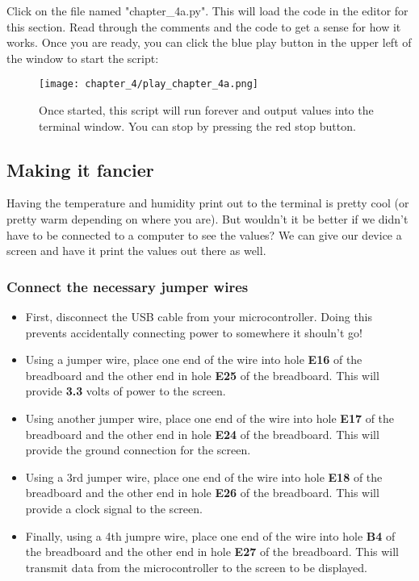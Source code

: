 Click on the file named "chapter\_4a.py". This will load the code in the editor for this section. Read through the comments
and the code to get a sense for how it works. Once you are ready, you can click the blue play button in the upper left of the window to start the script:
\begin{figure}[H]
    \centering
    \texttt{[image: chapter\_4/play\_chapter\_4a.png]}
    \caption{Once started, this script will run forever and output values into the terminal window. You can stop by pressing the red stop button.}
\end{figure}

\subsection{Making it fancier}
Having the temperature and humidity print out to the terminal is pretty cool (or pretty warm depending on where you are).
But wouldn't it be better if we didn't have to be connected to a computer to see the values? We can give our device a screen and have it print the values out there as well.

\subsubsection{Connect the necessary jumper wires}
\begin{itemize}
    \item First, disconnect the USB cable from your microcontroller. Doing this prevents accidentally connecting power to somewhere it shouln't go!
    \item Using a jumper wire, place one end of the wire into hole \textbf{E16} of the breadboard and the other end in
    hole \textbf{E25} of the breadboard. This will provide \textbf{3.3} volts of power to the screen.
    \item Using another jumper wire, place one end of the wire into hole \textbf{E17} of the breadboard and the other end
    in hole \textbf{E24} of the breadboard. This will provide the ground connection for the screen.
    \item Using a 3rd jumper wire, place one end of the wire into hole \textbf{E18} of the breadboard and the other end
    in hole \textbf{E26} of the breadboard. This will provide a clock signal to the screen.
    \item Finally, using a 4th jumpre wire, place one end of the wire into hole \textbf{B4} of the breadboard and the other
    end in hole \textbf{E27} of the breadboard. This will transmit data from the microcontroller to the screen to be displayed.
\end{itemize}


